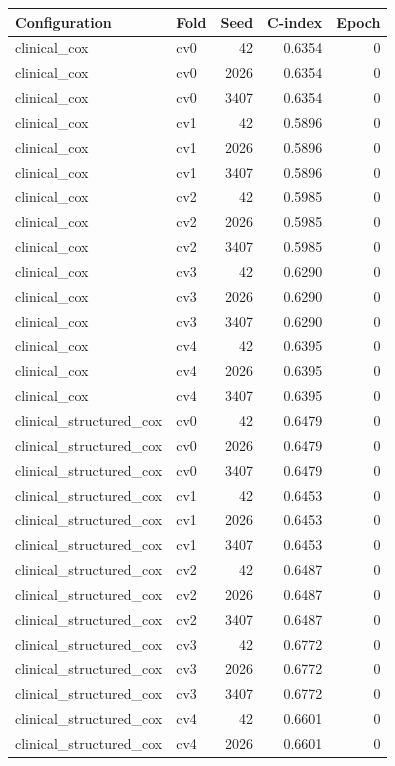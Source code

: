 \documentclass[10pt]{article}
\begin{document}
\begin{longtable}{llrrr}\hline Configuration & Fold & Seed & C-index & Epoch\\\hline
clinical\_cox & cv0 & 42 & 0.6354 & 0\\
clinical\_cox & cv0 & 2026 & 0.6354 & 0\\
clinical\_cox & cv0 & 3407 & 0.6354 & 0\\
clinical\_cox & cv1 & 42 & 0.5896 & 0\\
clinical\_cox & cv1 & 2026 & 0.5896 & 0\\
clinical\_cox & cv1 & 3407 & 0.5896 & 0\\
clinical\_cox & cv2 & 42 & 0.5985 & 0\\
clinical\_cox & cv2 & 2026 & 0.5985 & 0\\
clinical\_cox & cv2 & 3407 & 0.5985 & 0\\
clinical\_cox & cv3 & 42 & 0.6290 & 0\\
clinical\_cox & cv3 & 2026 & 0.6290 & 0\\
clinical\_cox & cv3 & 3407 & 0.6290 & 0\\
clinical\_cox & cv4 & 42 & 0.6395 & 0\\
clinical\_cox & cv4 & 2026 & 0.6395 & 0\\
clinical\_cox & cv4 & 3407 & 0.6395 & 0\\
clinical\_structured\_cox & cv0 & 42 & 0.6479 & 0\\
clinical\_structured\_cox & cv0 & 2026 & 0.6479 & 0\\
clinical\_structured\_cox & cv0 & 3407 & 0.6479 & 0\\
clinical\_structured\_cox & cv1 & 42 & 0.6453 & 0\\
clinical\_structured\_cox & cv1 & 2026 & 0.6453 & 0\\
clinical\_structured\_cox & cv1 & 3407 & 0.6453 & 0\\
clinical\_structured\_cox & cv2 & 42 & 0.6487 & 0\\
clinical\_structured\_cox & cv2 & 2026 & 0.6487 & 0\\
clinical\_structured\_cox & cv2 & 3407 & 0.6487 & 0\\
clinical\_structured\_cox & cv3 & 42 & 0.6772 & 0\\
clinical\_structured\_cox & cv3 & 2026 & 0.6772 & 0\\
clinical\_structured\_cox & cv3 & 3407 & 0.6772 & 0\\
clinical\_structured\_cox & cv4 & 42 & 0.6601 & 0\\
clinical\_structured\_cox & cv4 & 2026 & 0.6601 & 0\\

\end{longtable}
\end{document}
